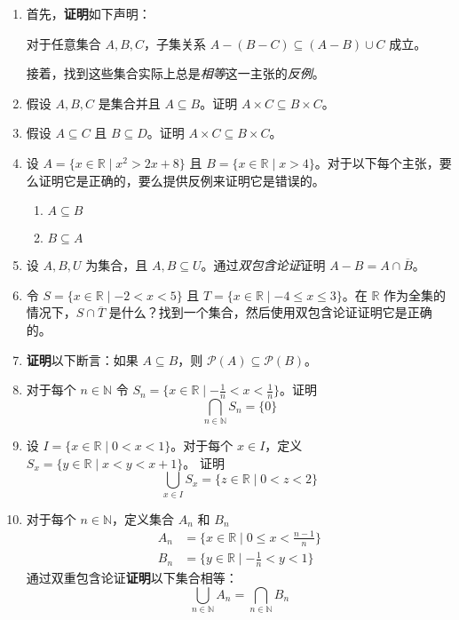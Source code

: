 \begin{enumerate}[label=(\arabic*)]
    \item 首先，\textbf{证明}如下声明：
        \begin{center}
            对于任意集合 $A,B,C$，子集关系 $A - (B - C) \subseteq (A - B) \cup C$ 成立。
        \end{center}
        接着，找到这些集合实际上总是\emph{相等}这一主张的\emph{反例}。
    \item 假设 $A,B,C$ 是集合并且 $A \subseteq B$。证明 $A \times C \subseteq B \times C$。
    \item 假设 $A \subseteq C$ 且 $B \subseteq D$。证明 $A \times C \subseteq B \times C$。
    \item 设 $A = \{x \in \mathbb{R} \mid x^2 > 2x + 8\}$ 且 $B = \{x \in \mathbb{R} \mid x > 4\}$。对于以下每个主张，要么证明它是正确的，要么提供反例来证明它是错误的。
        \begin{enumerate}[label=(\alph*)]
            \item $A \subseteq B$
            \item $B \subseteq A$
        \end{enumerate}
    \item 设 $A, B, U$ 为集合，且 $A, B \subseteq U$。通过\emph{双包含论证}证明 $A - B = A \cap \overline{B}$。
    \item 令 $S = \{x \in \mathbb{R} \mid -2 < x < 5\}$ 且 $T = \{x \in \mathbb{R} \mid -4 \le x \le 3\}$。在 $\mathbb{R}$ 作为全集的情况下，$S \cap \overline{T}$ 是什么？找到一个集合，然后使用双包含论证证明它是正确的。
    \item \textbf{证明}以下断言：如果 $A \subseteq B$，则 $\mathcal{P}(A) \subseteq \mathcal{P}(B)$。
    \item 对于每个 $n \in \mathbb{N}$ 令 $S_n = \{x \in \mathbb{R} \mid -\frac{1}{n} < x < \frac{1}{n}\}$。证明
        \[\bigcap_{n \in \mathbb{N}}S_n = \{0\}\]
    \item 设 $I = \{x \in \mathbb{R} \mid 0 < x < 1\}$。对于每个 $x \in I$，定义 $S_x = \{y \in \mathbb{R} \mid x < y < x + 1\}$。 证明
        \[\bigcup_{x \in I}S_x = \{z \in \mathbb{R} \mid 0 < z < 2\}\]
    \item 对于每个 $n \in \mathbb{N}$，定义集合 $A_n$ 和 $B_n$
        \begin{align*}
            A_n &= \Big\{x \in \mathbb{R} \mid 0 ≤ x < \frac{n - 1}{n}\Big\} \\
            B_n &= \Big\{y \in \mathbb{R} \mid -\frac{1}{n} < y < 1\Big\}
        \end{align*}
        通过双重包含论证\textbf{证明}以下集合相等：
        \[\bigcup_{n \in \mathbb{N}}A_n = \bigcap_{n \in \mathbb{N}}B_n\]
\end{enumerate}
